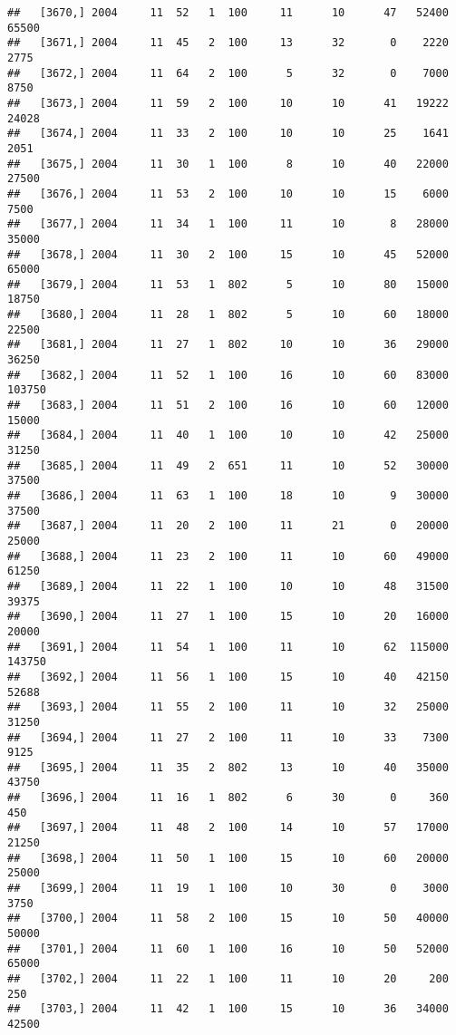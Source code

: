 \documentclass{article}\usepackage[]{graphicx}\usepackage[]{color}
\makeatletter
\newenvironment{kframe}{%
 \def\at@end@of@kframe{}%
 \ifinner\ifhmode%
  \def\at@end@of@kframe{\end{minipage}}%
  \begin{minipage}{\columnwidth}%
 \fi\fi%
 \def\FrameCommand##1{\hskip\@totalleftmargin \hskip-\fboxsep
 \colorbox{shadecolor}{##1}\hskip-\fboxsep
     \hskip-\linewidth \hskip-\@totalleftmargin \hskip\columnwidth}%
 \MakeFramed {\advance\hsize-\width
   \@totalleftmargin\z@ \linewidth\hsize
   \@setminipage}}%
 {\par\unskip\endMakeFramed%
 \at@end@of@kframe}
\newenvironment{knitrout}{}{} %
\makeatother
\begin{document}
\begin{knitrout}
\begin{kframe}
\begin{verbatim}
##   [3670,] 2004     11  52   1  100     11      10      47   52400   65500
##   [3671,] 2004     11  45   2  100     13      32       0    2220    2775
##   [3672,] 2004     11  64   2  100      5      32       0    7000    8750
##   [3673,] 2004     11  59   2  100     10      10      41   19222   24028
##   [3674,] 2004     11  33   2  100     10      10      25    1641    2051
##   [3675,] 2004     11  30   1  100      8      10      40   22000   27500
##   [3676,] 2004     11  53   2  100     10      10      15    6000    7500
##   [3677,] 2004     11  34   1  100     11      10       8   28000   35000
##   [3678,] 2004     11  30   2  100     15      10      45   52000   65000
##   [3679,] 2004     11  53   1  802      5      10      80   15000   18750
##   [3680,] 2004     11  28   1  802      5      10      60   18000   22500
##   [3681,] 2004     11  27   1  802     10      10      36   29000   36250
##   [3682,] 2004     11  52   1  100     16      10      60   83000  103750
##   [3683,] 2004     11  51   2  100     16      10      60   12000   15000
##   [3684,] 2004     11  40   1  100     10      10      42   25000   31250
##   [3685,] 2004     11  49   2  651     11      10      52   30000   37500
##   [3686,] 2004     11  63   1  100     18      10       9   30000   37500
##   [3687,] 2004     11  20   2  100     11      21       0   20000   25000
##   [3688,] 2004     11  23   2  100     11      10      60   49000   61250
##   [3689,] 2004     11  22   1  100     10      10      48   31500   39375
##   [3690,] 2004     11  27   1  100     15      10      20   16000   20000
##   [3691,] 2004     11  54   1  100     11      10      62  115000  143750
##   [3692,] 2004     11  56   1  100     15      10      40   42150   52688
##   [3693,] 2004     11  55   2  100     11      10      32   25000   31250
##   [3694,] 2004     11  27   2  100     11      10      33    7300    9125
##   [3695,] 2004     11  35   2  802     13      10      40   35000   43750
##   [3696,] 2004     11  16   1  802      6      30       0     360     450
##   [3697,] 2004     11  48   2  100     14      10      57   17000   21250
##   [3698,] 2004     11  50   1  100     15      10      60   20000   25000
##   [3699,] 2004     11  19   1  100     10      30       0    3000    3750
##   [3700,] 2004     11  58   2  100     15      10      50   40000   50000
##   [3701,] 2004     11  60   1  100     16      10      50   52000   65000
##   [3702,] 2004     11  22   1  100     11      10      20     200     250
##   [3703,] 2004     11  42   1  100     15      10      36   34000   42500

\end{verbatim}
\end{kframe}
\end{knitrout}
\end{document}
